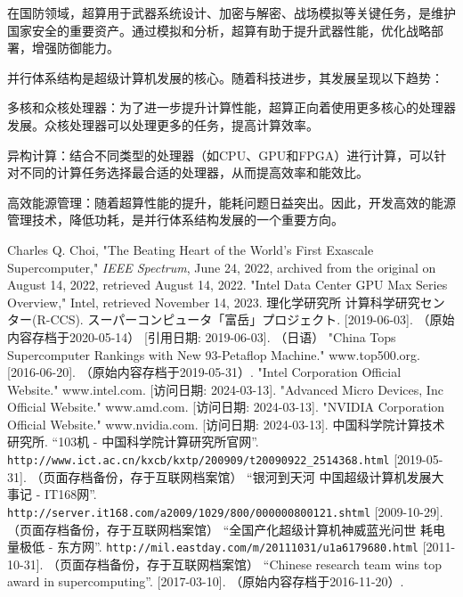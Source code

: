 \documentclass{ctexart}
\begin{document}
在国防领域，超算用于武器系统设计、加密与解密、战场模拟等关键任务，是维护国家安全的重要资产。通过模拟和分析，超算有助于提升武器性能，优化战略部署，增强防御能力。

并行体系结构是超级计算机发展的核心。随着科技进步，其发展呈现以下趋势：

多核和众核处理器：为了进一步提升计算性能，超算正向着使用更多核心的处理器发展。众核处理器可以处理更多的任务，提高计算效率。

异构计算：结合不同类型的处理器（如CPU、GPU和FPGA）进行计算，可以针对不同的计算任务选择最合适的处理器，从而提高效率和能效比。

高效能源管理：随着超算性能的提升，能耗问题日益突出。因此，开发高效的能源管理技术，降低功耗，是并行体系结构发展的一个重要方向。
\begin{thebibliography}{99}
Charles Q. Choi, "The Beating Heart of the World's First Exascale Supercomputer," \textit{IEEE Spectrum}, June 24, 2022, archived from the original on August 14, 2022, retrieved August 14, 2022.
"Intel Data Center GPU Max Series Overview," Intel, retrieved November 14, 2023.
理化学研究所 计算科学研究センター(R-CCS). スーパーコンピュータ「富岳」プロジェクト. [2019-06-03]. （原始内容存档于2020-05-14） [引用日期: 2019-06-03]. （日语）
"China Tops Supercomputer Rankings with New 93-Petaflop Machine." www.top500.org. [2016-06-20]. （原始内容存档于2019-05-31）.
"Intel Corporation Official Website." www.intel.com. [访问日期: 2024-03-13].
"Advanced Micro Devices, Inc Official Website." www.amd.com. [访问日期: 2024-03-13].
"NVIDIA Corporation Official Website." www.nvidia.com. [访问日期: 2024-03-13].
中国科学院计算技术研究所. ``103机 - 中国科学院计算研究所官网''. \texttt{http://www.ict.ac.cn/kxcb/kxtp/200909/t20090922\_2514368.html} [2019-05-31]. （页面存档备份，存于互联网档案馆）
``银河到天河 中国超级计算机发展大事记 - IT168网''. \texttt{http://server.it168.com/a2009/1029/800/000000800121.shtml} [2009-10-29]. （页面存档备份，存于互联网档案馆）
``全国产化超级计算机神威蓝光问世 耗电量极低 - 东方网''. \texttt{http://mil.eastday.com/m/20111031/u1a6179680.html} [2011-10-31]. （页面存档备份，存于互联网档案馆）
``Chinese research team wins top award in supercomputing''. [2017-03-10]. （原始内容存档于2016-11-20）.
\end{thebibliography}
\end{document}
